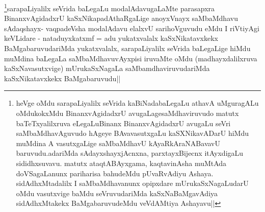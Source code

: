\begin{artha}
\footnote{heVge oMdu sarapaLiyalilx seVrida kaBiNadabaLegaLu athavA uMguragALu  oMdukokxMdu BinanxvAgidadxrU avugaLagesaMdhaviruvudo matutx baTeTxyalilxruva eLegaLuBinanx BinanxvAgidadxrU avugaLu seVri saMbaMdhavAguvudo hAgeye BAvavasutxgaLu kaSXNikavADarU hiMdu muMdina A vasutxgaLige saMbaMdhavU kAyaRkAraNABavavU baruvudu.adariMda sAdayxshayxjAcnxna, parxtayxBijecnx itAyxdigaLu sididhxsuvavu. matutx ataqtABAyxgama, kaqtavinAsha muMtAda doVSagaLanunx pariharisa bahudeMdu pUvaRvAdiyu Ashaya. sidAdhxMtadalilx I saMbaMdhavanunx opipxdare mUrukaSxNagaLudarU oMdu vasutxvige  baMdu seVruvudariMda kaSxNaBaMgavAdiya sidAdhxMtakekx BaMgabaruvudeMdu veVdAMtiya Ashayavu||}sarapaLiyalilx seVrida baLegaLu modalAdavugaLaMte parasapxra BinanxvAgidadxrU kaSxNikapadAthaRgaLige anoyxVnayx saMbaMdhavu sAdaqshayx- vaqpadeVsha modalAdavu elalxvU sarihoVguvudu eMdu I riVtiyAgi keVLidare - nataduyxkatxmf = adu yukatxvalalx kaSxNikatavxkekx BaMgabaruvudariMda yukatxvalalx, sarapaLiyalilx seVrida baLegaLige hiMdu muMdina baLegaLa saMbaMdhavuvAyxpisi iruvaMte oMdu (madhayxdalilxruva kaSxNavasutxvige) mUrukaSxNagaLa saMbamdhaviruvudariMda kaSxNikatavxkekx BaMgabaruvudu||
\end{artha}
\begin{artha}

\end{artha}

\begin{artha}

\end{artha}

\begin{artha}

\end{artha}

\begin{artha}

\end{artha}

\begin{artha}

\end{artha}

\begin{artha}

\end{artha}

\begin{artha}

\end{artha}

